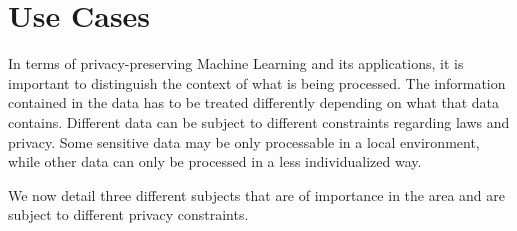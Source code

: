 
\section{Use Cases}
\label{sec:UseCases}


In terms of privacy-preserving Machine Learning and its applications, it is important to distinguish the context of what is being processed. The information contained in the data has to be treated differently depending on what that data contains. Different data can be subject to different constraints regarding laws and privacy. Some sensitive data may be only processable in a local environment, while other data can only be processed in a less individualized way.

We now detail three different subjects that are of importance in the area and are subject to different privacy constraints.

